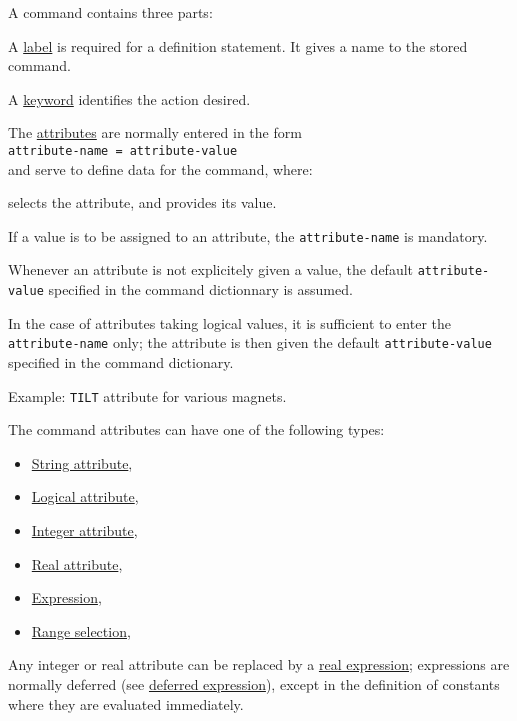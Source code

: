 A command contains three parts:
\begin{madlist}
   A \href{label.html}{label} is required for a definition statement. 
   It gives a name to the stored command.
     
   A \href{keyword.html}{keyword} identifies the action desired.
     
   The \href{attribute.html}{attributes} are normally entered in the
   form \\
   {\tt attribute-name = attribute-value} \\
   and serve to define data for the command, where:
   \begin{madlist}
        selects the attribute, and
        provides its value.       
     \end{madlist}
\end{madlist}

If a value is to be assigned to an attribute, the {\tt attribute-name} is
mandatory.

Whenever an attribute is not explicitely given a value, the default 
{\tt attribute-value} specified in the command dictionnary is assumed. 

In the case of attributes taking logical values, it is sufficient to
enter the {\tt attribute-name} only; the attribute is then given the
default {\tt attribute-value} specified in the command dictionary.

Example: {\tt TILT} attribute for various magnets.

The command attributes can have one of the following types:
\begin{itemize}
  \item \href{string.html}{String attribute},
  \item \href{logical.html}{Logical attribute},
  \item \href{integer.html}{Integer attribute},
  \item \href{real.html}{Real attribute},
  \item \href{expression.html}{Expression},
  \item \href{select.html}{Range selection},
\end{itemize}

Any integer or real attribute can be replaced by
a \href{expression.html}{real expression}; expressions are
normally deferred 
(see \href{expression.html#defer}{deferred expression}), except in the  
definition of constants where they are evaluated immediately.

